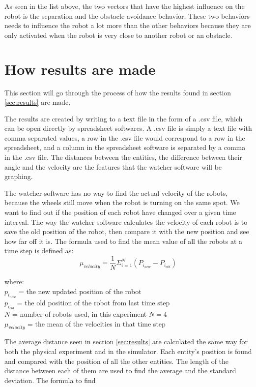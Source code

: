 As seen in the list above, the two vectors that have the highest influence on the robot is the separation and the obstacle avoidance behavior. These two behaviors needs to influence the robot a lot more than the other behaviors because they are only activated when the robot is very close to another robot or an obstacle.

\section{How results are made}
This section will go through the process of how the results found in section \ref{sec:results} are made.

The results are created by writing to a text file in the form of a .csv file, which can be open directly by spreadsheet softwares. A .csv file is simply a text file with comma separated values, a row in the .csv file would correspond to a row in the spreadsheet, and a column in the spreadsheet software is separated by a comma in the .csv file. The distances between the entities, the difference between their angle and the velocity are the features that the watcher software will be graphing.

The watcher software has no way to find the actual velocity of the robots, because the wheels still move when the robot is turning on the same spot. We want to find out if the position of each robot have changed over a given time interval.
The way the watcher software calculates the velocity of each robot is to save the old position of the robot, then compare it with the new position and see how far off it is.
The formula used to find the mean value of all the robots at a time step is defined as:
\begin{equation}
\label{eq:muvel}
\mu_{velocity} = \frac{1}{N} \Sigma_{i=1}^N (P_{i_{new}} - P_{i_{old}})
\end{equation}

where:
\\
$p_{i_{new}}$ = the new updated position of the robot
\\
$p_{i_{old}}$ = the old position of the robot from last time step
\\
$N$ = number of robots used, in this experiment $N = 4$ 
\\
$\mu_{velocity}$ = the mean of the velocities in that time step

The average distance seen in section \ref{sec:results} are calculated the same way for both the physical experiment and in the simulator. Each entity's position is found and compared with the position of all the other entities. The length of the distance between each of them are used to find the average and the standard deviation.
The formula to find 

